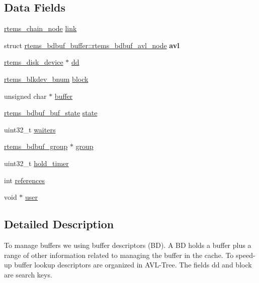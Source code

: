 \subsection*{Data Fields}
\begin{DoxyCompactItemize}
\item 
\mbox{\hyperlink{structChain__Node__struct}{rtems\+\_\+chain\+\_\+node}} \mbox{\hyperlink{structrtems__bdbuf__buffer_adc0235d4ee0b777a16433f3057cacdb8}{link}}
\item 
\mbox{\label{structrtems__bdbuf__buffer_a8d3eda69fc7189a3d2181894afe9bc5c}} 
struct \mbox{\hyperlink{structrtems__bdbuf__buffer_1_1rtems__bdbuf__avl__node}{rtems\+\_\+bdbuf\+\_\+buffer\+::rtems\+\_\+bdbuf\+\_\+avl\+\_\+node}} {\bfseries avl}
\item 
\mbox{\hyperlink{structrtems__disk__device}{rtems\+\_\+disk\+\_\+device}} $\ast$ \mbox{\hyperlink{structrtems__bdbuf__buffer_a30a0b9fb07a8e1debae704dbe2b06dd0}{dd}}
\item 
\mbox{\hyperlink{group__rtems__disk_ga5fbcfd40b657bff6c54d9e393fab3274}{rtems\+\_\+blkdev\+\_\+bnum}} \mbox{\hyperlink{structrtems__bdbuf__buffer_a5d67de9a2fe5257419575b98b26d7bca}{block}}
\item 
unsigned char $\ast$ \mbox{\hyperlink{structrtems__bdbuf__buffer_a501e0c67a7da6ca60fb570b338599d89}{buffer}}
\item 
\mbox{\hyperlink{group__rtems__bdbuf_ga0169f36547d36f0723b6456172eeef0a}{rtems\+\_\+bdbuf\+\_\+buf\+\_\+state}} \mbox{\hyperlink{structrtems__bdbuf__buffer_aee5d6927ffc83840b051e62f40ed4377}{state}}
\item 
uint32\+\_\+t \mbox{\hyperlink{structrtems__bdbuf__buffer_a1b1faa7c6d016c8c66a0c620a2908f6f}{waiters}}
\item 
\mbox{\hyperlink{structrtems__bdbuf__group}{rtems\+\_\+bdbuf\+\_\+group}} $\ast$ \mbox{\hyperlink{structrtems__bdbuf__buffer_ac3f028ff82e1d2a5a5068106ea531037}{group}}
\item 
uint32\+\_\+t \mbox{\hyperlink{structrtems__bdbuf__buffer_aec2379d26f4703257d9843bff6f6f733}{hold\+\_\+timer}}
\item 
int \mbox{\hyperlink{structrtems__bdbuf__buffer_a8d37d05349026cb2504cf7f692a798db}{references}}
\item 
void $\ast$ \mbox{\hyperlink{structrtems__bdbuf__buffer_a822b3c32a9b3042cbdf5632824d19c62}{user}}
\end{DoxyCompactItemize}


\subsection{Detailed Description}
To manage buffers we using buffer descriptors (BD). A BD holds a buffer plus a range of other information related to managing the buffer in the cache. To speed-\/up buffer lookup descriptors are organized in A\+V\+L-\/\+Tree. The fields \textquotesingle{}dd\textquotesingle{} and \textquotesingle{}block\textquotesingle{} are search keys. 

